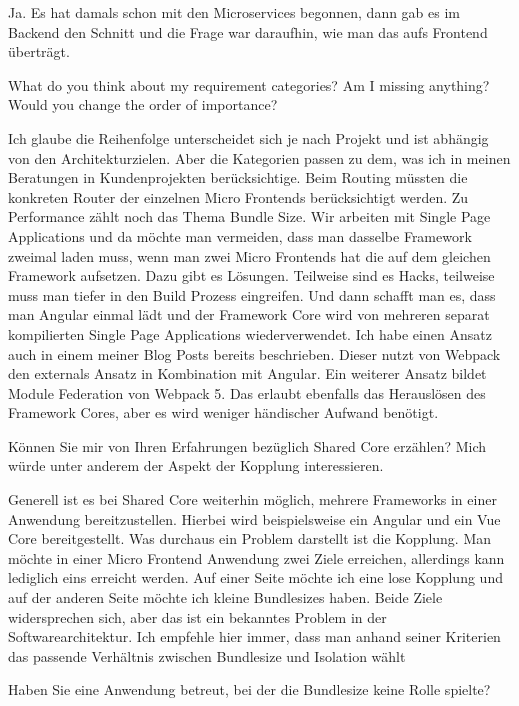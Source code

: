 \begin{description}
    \ManfredSteyer Ja. Es hat damals schon mit den Microservices begonnen, dann gab es im Backend den Schnitt und die Frage war daraufhin, wie man das aufs Frontend überträgt.

    \NicoVogel What do you think about my requirement categories? Am I missing anything? Would you change the order of importance?

    \ManfredSteyer Ich glaube die Reihenfolge unterscheidet sich je nach Projekt und ist abhängig von den Architekturzielen. Aber die Kategorien passen zu dem, was ich in meinen Beratungen in Kundenprojekten berücksichtige. Beim Routing müssten die konkreten Router der einzelnen Micro Frontends berücksichtigt werden. Zu Performance zählt noch das Thema Bundle Size. Wir arbeiten mit Single Page Applications und da möchte man vermeiden, dass man dasselbe Framework zweimal laden muss, wenn man zwei Micro Frontends hat die auf dem gleichen Framework aufsetzen. Dazu gibt es Lösungen. Teilweise sind es Hacks, teilweise muss man tiefer in den Build Prozess eingreifen. Und dann schafft man es, dass man Angular einmal lädt und der Framework Core wird von mehreren separat kompilierten Single Page Applications wiederverwendet.
    Ich habe einen Ansatz auch in einem meiner Blog Posts bereits beschrieben. Dieser nutzt von Webpack den externals Ansatz in Kombination mit Angular. Ein weiterer Ansatz bildet Module Federation von Webpack 5. Das erlaubt ebenfalls das Herauslösen des Framework Cores, aber es wird weniger händischer Aufwand benötigt.

    \NicoVogel Können Sie mir von Ihren Erfahrungen bezüglich Shared Core erzählen? Mich würde unter anderem der Aspekt der Kopplung interessieren.

    \ManfredSteyer Generell ist es bei Shared Core weiterhin möglich, mehrere Frameworks in einer Anwendung bereitzustellen. Hierbei wird beispielsweise ein Angular und ein Vue Core bereitgestellt. Was durchaus ein Problem darstellt ist die Kopplung. Man möchte in einer Micro Frontend Anwendung zwei Ziele erreichen, allerdings kann lediglich eins erreicht werden. Auf einer Seite möchte ich eine lose Kopplung und auf der anderen Seite möchte ich kleine Bundlesizes haben. Beide Ziele widersprechen sich, aber das ist ein bekanntes Problem in der Softwarearchitektur. Ich empfehle hier immer, dass man anhand seiner Kriterien das passende Verhältnis zwischen Bundlesize und Isolation wählt

    \NicoVogel Haben Sie eine Anwendung betreut, bei der die Bundlesize keine Rolle spielte?


\end{description}
